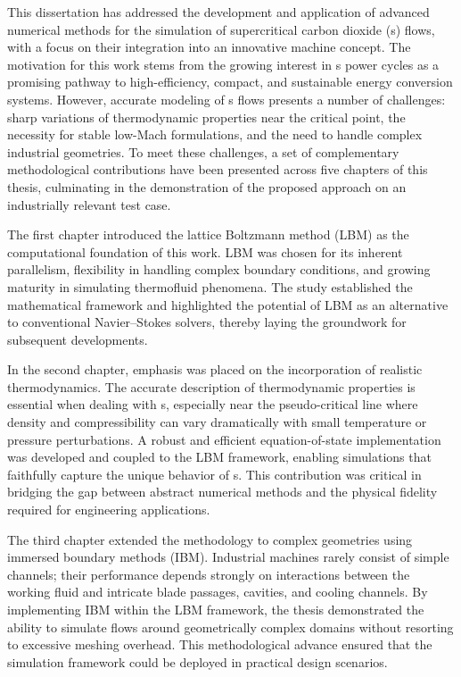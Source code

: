 
This dissertation has addressed the development and application of advanced
numerical methods for the simulation of supercritical carbon dioxide (s)
flows, with a focus on their integration into an innovative machine concept. The
motivation for this work stems from the growing interest in s power cycles as
a promising pathway to high-efficiency, compact, and sustainable energy
conversion systems. However, accurate modeling of s flows presents a number
of challenges: sharp variations of thermodynamic properties near the critical
point, the necessity for stable low-Mach formulations, and the need to handle
complex industrial geometries. To meet these challenges, a set of complementary
methodological contributions have been presented across five chapters of this
thesis, culminating in the demonstration of the proposed approach on an
industrially relevant test case.


The first chapter introduced the lattice Boltzmann method (LBM) as the
computational foundation of this work. LBM was chosen for its inherent
parallelism, flexibility in handling complex boundary conditions, and growing
maturity in simulating thermofluid phenomena. The study established the
mathematical framework and highlighted the potential of LBM as an alternative to
conventional Navier–Stokes solvers, thereby laying the groundwork for subsequent
developments.

In the second chapter, emphasis was placed on the incorporation of realistic
thermodynamics. The accurate description of thermodynamic properties is
essential when dealing with s, especially near the pseudo-critical line where
density and compressibility can vary dramatically with small temperature or
pressure perturbations. A robust and efficient equation-of-state implementation
was developed and coupled to the LBM framework, enabling simulations that
faithfully capture the unique behavior of s. This contribution was critical
in bridging the gap between abstract numerical methods and the physical fidelity
required for engineering applications.

The third chapter extended the methodology to complex geometries using immersed
boundary methods (IBM). Industrial machines rarely consist of simple channels;
their performance depends strongly on interactions between the working fluid and
intricate blade passages, cavities, and cooling channels. By implementing IBM
within the LBM framework, the thesis demonstrated the ability to simulate flows
around geometrically complex domains without resorting to excessive meshing
overhead. This methodological advance ensured that the simulation framework
could be deployed in practical design scenarios.

